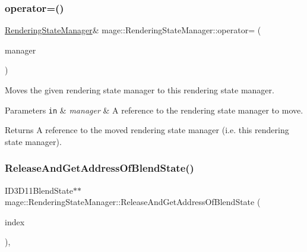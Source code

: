 \subsubsection{\texorpdfstring{operator=()}{operator=()}\hspace{0.1cm}{\footnotesize\ttfamily [2/2]}}
{\footnotesize\ttfamily \hyperlink{classmage_1_1_rendering_state_manager}{Rendering\+State\+Manager}\& mage\+::\+Rendering\+State\+Manager\+::operator= (\begin{DoxyParamCaption}\item[{\hyperlink{classmage_1_1_rendering_state_manager}{Rendering\+State\+Manager} \&\&}]{manager }\end{DoxyParamCaption})\hspace{0.3cm}{\ttfamily [delete]}}

Moves the given rendering state manager to this rendering state manager.


\begin{DoxyParams}[1]{Parameters}
\mbox{\tt in}  & {\em manager} & A reference to the rendering state manager to move. \\
\hline
\end{DoxyParams}
\begin{DoxyReturn}{Returns}
A reference to the moved rendering state manager (i.\+e. this rendering state manager). 
\end{DoxyReturn}
\hypertarget{classmage_1_1_rendering_state_manager_ad7626daab9a488a34ab50df3768d5bc9}{}\label{classmage_1_1_rendering_state_manager_ad7626daab9a488a34ab50df3768d5bc9} 
\subsubsection{\texorpdfstring{Release\+And\+Get\+Address\+Of\+Blend\+State()}{ReleaseAndGetAddressOfBlendState()}}
{\footnotesize\ttfamily I\+D3\+D11\+Blend\+State$\ast$$\ast$ mage\+::\+Rendering\+State\+Manager\+::\+Release\+And\+Get\+Address\+Of\+Blend\+State (\begin{DoxyParamCaption}\item[{\hyperlink{classmage_1_1_rendering_state_manager_a499a47606ff73352331177b668c4b64c}{Blend\+State\+Index}}]{index }\end{DoxyParamCaption})\hspace{0.3cm}{\ttfamily [private]}, {\ttfamily [noexcept]}}

